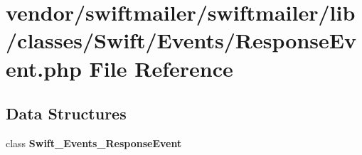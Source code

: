 \section{vendor/swiftmailer/swiftmailer/lib/classes/\+Swift/\+Events/\+Response\+Event.php File Reference}
\label{_response_event_8php}
\subsection*{Data Structures}
\begin{DoxyCompactItemize}
\item 
class {\bf Swift\+\_\+\+Events\+\_\+\+Response\+Event}
\end{DoxyCompactItemize}
